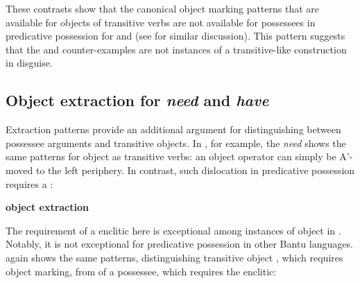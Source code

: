\documentclass[output=paper,
modfonts
]{langscibook}
\begin{document}

These contrasts show that the canonical object marking patterns that
are available for objects of transitive verbs are not available for
possessees in predicative possession for  and  (see \citealt{Antonov:2014} for similar discussion).  This pattern
suggests that the  and  counter-examples are not instances of
a transitive-like construction in disguise. 

\subsection{Object extraction for {\it need} and {\it have}}

Extraction patterns provide an additional argument for distinguishing
between possessee arguments and transitive objects. In , for
example, the  {\it need} shows the same patterns for object
 as transitive verbs:  an object operator can simply be
A'-moved to the left periphery. In contrast, such dislocation
in predicative possession requires a  : 

\begin{exe}
\ex \textbf{ object extraction} \begin{xlist}



\end{xlist}
\end{exe}

The requirement of a  enclitic here is exceptional among
instances of object  in .  Notably,  it is not
exceptional for predicative possession in other Bantu languages. 
again shows the same patterns, distinguishing transitive object
, which requires object marking, from  of a
possessee, which requires the enclitic: 
\end{document}
